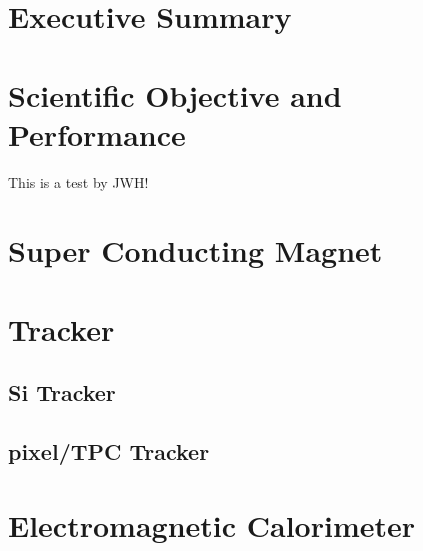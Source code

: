 \documentclass[12pt,twoside,notitlepage]{book}
\begin{document}
 
\frontmatter
\pagestyle{empty}



\cleardoublepage
\pagestyle{fancy}

\chapter*{Executive Summary}
\label{exec_summ}


\setcounter{page}{1}

\cleardoublepage

\resetlinenumber

\tableofcontents
\cleardoublepage

\mainmatter

\renewcommand{\thepage}{\arabic{page}}
\setcounter{chapter}{0}
\setcounter{page}{1}

\chapter{Scientific Objective and Performance}
\label{sci_obj_perf}

This is a test by JWH!
 
\chapter{Super Conducting Magnet}
\label{magnet}

 
\chapter{Tracker}
\label{tracker}

\section{Si Tracker}
\section{pixel/TPC Tracker}
 
\chapter{Electromagnetic Calorimeter}
\label{emcal}

 
\end{document}
